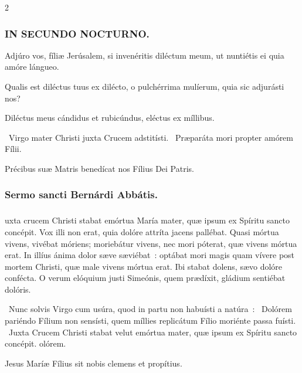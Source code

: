 \documentclass[9pt,twoside]{extarticle}
\begin{document}
\begin{multicols}{2}
\subsubsection*{\center \textsc{IN SECUNDO NOCTURNO.}}
\begin{tightlist}{}
\item {} Adjúro vos, fíliæ Jerúsalem, si invenéritis diléctum meum, ut nuntiétis ei quia amóre lángueo.
\item {} Qualis est diléctus tuus ex dilécto, o pulchérrima mulíerum, quia sic adjurásti nos?
\item {} Diléctus meus cándidus et rubicúndus, eléctus ex míllibus.
\item {}~Virgo mater Christi juxta Crucem adstitísti. ~Præparáta mori propter amórem Fílii.
\item {\small {} Précibus suæ Matris benedícat nos Fílius Dei Patris.}
\end{tightlist}

\subsubsection*{\center Sermo sancti Bernárdi Abbátis.}
\subsubsection*{\center {}}
uxta crucem Christi stabat emórtua María mater, quæ ipsum ex Spíritu sancto concépit. Vox illi non erat, quia dolóre attríta jacens pallébat. Quasi mórtua vivens, vivébat móriens; moriebátur vivens, nec mori póterat, quæ vivens mórtua erat. In illíus ánima dolor sæve sæviébat~: optábat mori magis quam vívere post mortem Christi, quæ male vivens mórtua erat. Ibi stabat dolens, sævo dolóre confécta. O verum elóquium justi Simeónis, quem prædíxit, gládium sentiébat dolóris.

\begin{tightlist}{}
\item {}~Nunc solvis Virgo cum usúra, quod in partu non habuísti a natúra~: \textred{*}~Dolórem pariéndo Fílium non sensísti, quem míllies replicátum Fílio moriénte passa fuísti. ~Juxta Crucem Christi stabat velut emórtua mater, quæ ipsum ex Spíritu sancto concépit. olórem.
\item {\small {} Jesus Maríæ Fílius sit nobis clemens et propítius.}
\end{tightlist}


\end{multicols}
\end{document}
